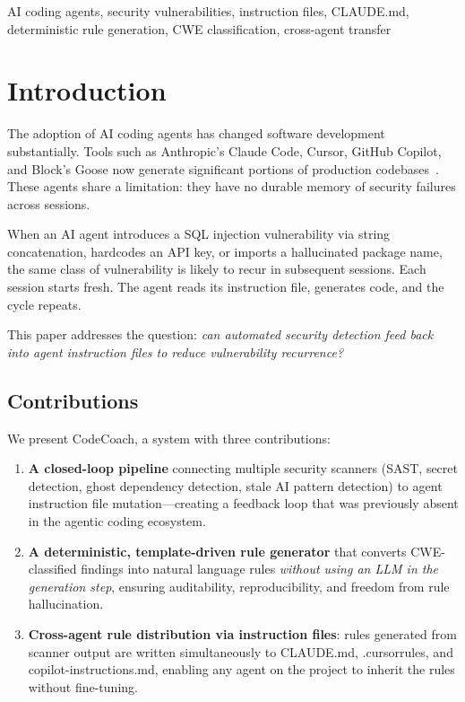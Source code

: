 \documentclass[conference,10pt]{IEEEtran}
\begin{document}
\begin{IEEEkeywords}
AI coding agents, security vulnerabilities, instruction files, CLAUDE.md, deterministic rule generation, CWE classification, cross-agent transfer
\end{IEEEkeywords}

\section{Introduction}

The adoption of AI coding agents has changed software development substantially. Tools such as Anthropic's Claude Code, Cursor, GitHub Copilot, and Block's Goose now generate significant portions of production codebases~\cite{anthropic-claude-code}. These agents share a limitation: they have no durable memory of security failures across sessions.

When an AI agent introduces a SQL injection vulnerability via string concatenation, hardcodes an API key, or imports a hallucinated package name, the same class of vulnerability is likely to recur in subsequent sessions. Each session starts fresh. The agent reads its instruction file, generates code, and the cycle repeats.

This paper addresses the question: \textit{can automated security detection feed back into agent instruction files to reduce vulnerability recurrence?}

\subsection{Contributions}

We present CodeCoach, a system with three contributions:

\begin{enumerate}
    \item \textbf{A closed-loop pipeline} connecting multiple security scanners (SAST, secret detection, ghost dependency detection, stale AI pattern detection) to agent instruction file mutation---creating a feedback loop that was previously absent in the agentic coding ecosystem.

    \item \textbf{A deterministic, template-driven rule generator} that converts CWE-classified findings into natural language rules \textit{without using an LLM in the generation step}, ensuring auditability, reproducibility, and freedom from rule hallucination.

    \item \textbf{Cross-agent rule distribution via instruction files}: rules generated from scanner output are written simultaneously to CLAUDE.md, .cursorrules, and copilot-instructions.md, enabling any agent on the project to inherit the rules without fine-tuning.
\end{enumerate}
\end{document}
